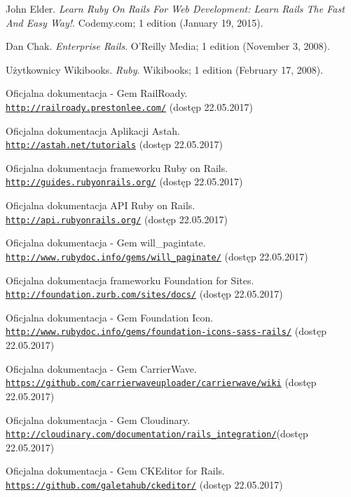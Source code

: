 \documentclass[openright]{xmgr}
\begin{document}
\begin{thebibliography}{9}
John Elder.
\textit{Learn Ruby On Rails For Web Development: Learn Rails The Fast And Easy Way!}.
Codemy.com; 1 edition (January 19, 2015).

Dan Chak.
\textit{Enterprise Rails}.
O'Reilly Media; 1 edition (November 3, 2008).

Użytkownicy Wikibooks.
\textit{Ruby}.
Wikibooks; 1 edition (February 17, 2008).

Oficjalna dokumentacja - Gem RailRoady.
\\\texttt{\url{http://railroady.prestonlee.com/}} (dostęp 22.05.2017)

Oficjalna dokumentacja Aplikacji Astah.
\\\texttt{\url{http://astah.net/tutorials}} (dostęp 22.05.2017)

Oficjalna dokumentacja frameworku Ruby on Rails.
\\\texttt{\url{http://guides.rubyonrails.org/}} (dostęp 22.05.2017)

Oficjalna dokumentacja API Ruby on Rails.
\\\texttt{\url{http://api.rubyonrails.org/}} (dostęp 22.05.2017)

Oficjalna dokumentacja - Gem will\_pagintate.
\\\texttt{\url{http://www.rubydoc.info/gems/will_paginate/}} (dostęp 22.05.2017)

Oficjalna dokumentacja frameworku Foundation for Sites.
\\\texttt{\url{http://foundation.zurb.com/sites/docs/}} (dostęp 22.05.2017)

Oficjalna dokumentacja - Gem Foundation Icon.
\\\texttt{\url{http://www.rubydoc.info/gems/foundation-icons-sass-rails/}} (dostęp 22.05.2017)

Oficjalna dokumentacja - Gem CarrierWave.
\\\texttt{\url{https://github.com/carrierwaveuploader/carrierwave/wiki}} (dostęp 22.05.2017)

Oficjalna dokumentacja - Gem Cloudinary.
\\\texttt{\url{http://cloudinary.com/documentation/rails_integration/}}\break (dostęp 22.05.2017)

Oficjalna dokumentacja - Gem CKEditor for Rails.
\\\texttt{\url{https://github.com/galetahub/ckeditor/}} (dostęp 22.05.2017)


\end{thebibliography}
\end{document}
